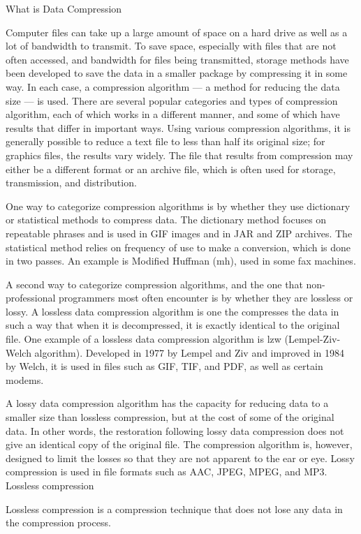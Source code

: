 What is Data Compression


Computer files can take up a large amount of space on a hard drive as well as a lot of bandwidth to transmit. To save space, especially with files that are not often accessed, and bandwidth for files being transmitted, storage methods have been developed to save the data in a smaller package by compressing it in some way. In each case, a compression algorithm — a method for reducing the data size — is used. There are several popular categories and types of compression algorithm, each of which works in a different manner, and some of which have results that differ in important ways. Using various compression algorithms, it is generally possible to reduce a text file to less than half its original size; for graphics files, the results vary widely. The file that results from compression may either be a different format or an archive file, which is often used for storage, transmission, and distribution.


One way to categorize compression algorithms is by whether they use dictionary or statistical methods to compress data. The dictionary method focuses on repeatable phrases and is used in GIF images and in JAR and ZIP archives. The statistical method relies on frequency of use to make a conversion, which is done in two passes. An example is Modified Huffman (mh), used in some fax machines.


A second way to categorize compression algorithms, and the one that non-professional programmers most often encounter is by whether they are lossless or lossy. A lossless data compression algorithm is one the compresses the data in such a way that when it is decompressed, it is exactly identical to the original file. One example of a lossless data compression algorithm is lzw (Lempel-Ziv-Welch algorithm). Developed in 1977 by Lempel and Ziv and improved in 1984 by Welch, it is used in files such as GIF, TIF, and PDF, as well as certain modems.


A lossy data compression algorithm has the capacity for reducing data to a smaller size than lossless compression, but at the cost of some of the original data. In other words, the restoration following lossy data compression does not give an identical copy of the original file. The compression algorithm is, however, designed to limit the losses so that they are not apparent to the ear or eye. Lossy compression is used in file formats such as AAC, JPEG, MPEG, and MP3.
Lossless compression

Lossless compression is a compression technique that does not lose any data in the compression process.


